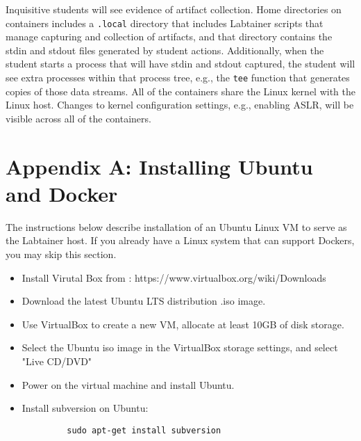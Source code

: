 \documentclass{article}
\begin{document}
Inquisitive students will see evidence of artifact collection.  Home directories
on containers includes a \texttt{.local} directory that includes Labtainer scripts that manage
capturing and collection of artifacts, and that directory contains the stdin and
stdout files generated by student actions. Additionally, when the student starts a process
that will have stdin and stdout captured, the student will see extra processes within
that process tree, e.g., the \texttt{tee} function that generates copies of those data streams.
All of the containers share the Linux kernel with the Linux host.  Changes to
kernel configuration settings, e.g., enabling ASLR, will be visible across all
of the containers.

\newpage
\appendix 
\section {Appendix A: Installing Ubuntu and Docker}
\label{sec:appendixA}
The instructions below describe installation of an Ubuntu Linux VM 
to serve as the Labtainer host.  If you already have a Linux system
that can support Dockers, you may skip this section.
\begin{itemize}
\item Install Virutal Box from : https://www.virtualbox.org/wiki/Downloads
\item Download the latest Ubuntu LTS distribution .iso image.
\item Use VirtualBox to create a new VM, allocate at least 10GB of disk storage.
\item Select the Ubuntu iso image in the VirtualBox storage settings, and select "Live CD/DVD"
\item Power on the virtual machine and install Ubuntu.
\item Install subversion on Ubuntu:
\begin{verbatim}
         sudo apt-get install subversion
\end{verbatim}
\end{itemize}
\end{document}
